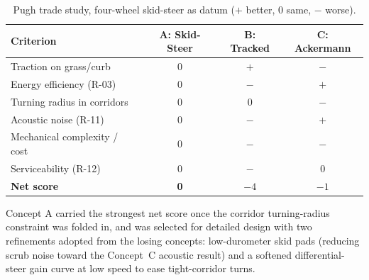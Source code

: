 \begin{table}[htbp]
\centering
\caption{Pugh trade study, four-wheel skid-steer as datum ($+$ better, $0$ same, $-$ worse).}
\label{tab:pugh}
\small
\begin{tabular}{@{}lccc@{}}
\toprule
\textbf{Criterion} & \textbf{A: Skid-Steer} & \textbf{B: Tracked} & \textbf{C: Ackermann} \\
\midrule
Traction on grass/curb        & 0  & $+$ & $-$ \\
Energy efficiency (R-03)      & 0  & $-$ & $+$ \\
Turning radius in corridors   & 0  & 0   & $-$ \\
Acoustic noise (R-11)         & 0  & $-$ & $+$ \\
Mechanical complexity / cost  & 0  & $-$ & $-$ \\
Serviceability (R-12)         & 0  & $-$ & 0   \\
\midrule
\textbf{Net score}            & \textbf{0} & $-4$ & $-1$ \\
\bottomrule
\end{tabular}
\end{table}

Concept A carried the strongest net score once the corridor turning-radius
constraint was folded in, and was selected for detailed design with two
refinements adopted from the losing concepts: low-durometer skid pads
(reducing scrub noise toward the Concept~C acoustic result) and a softened
differential-steer gain curve at low speed to ease tight-corridor turns.
